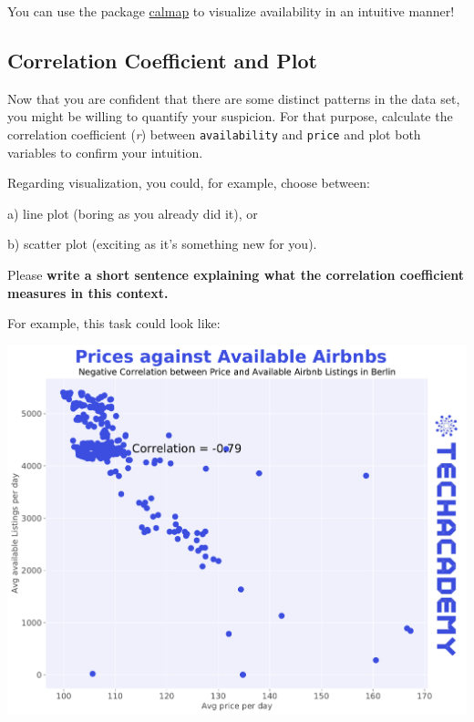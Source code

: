 \documentclass[
  11pt,
]{article}
\newenvironment{tipsp}[1]
  {
  \begin{itemize}
  \footnotesize
  \renewcommand{\labelitemi}{
    \raisebox{-.7\height}[0pt][0pt]{
      {\setkeys{Gin}{width=3em,keepaspectratio}
        \texttt{[image: images/\#1.png]}}
    }
  }
  \setlength{\fboxsep}{1em}
  \begin{pbox}
  \item
  }
  {
  \end{pbox}
  \end{itemize}
  }
\begin{document}
\begin{tipsp}p
You can use the package \href{https://pythonhosted.org/calmap/}{calmap} to visualize availability in an intuitive manner!

\end{tipsp}

\hypertarget{correlation-coefficient-and-plot}{%
\subsection{Correlation Coefficient and Plot}\label{correlation-coefficient-and-plot}}

Now that you are confident that there are some distinct patterns in the data set, you might be willing to quantify your suspicion.
For that purpose, calculate the correlation coefficient (\emph{r}) between \texttt{availability} and \texttt{price} and plot both variables to confirm your intuition.

Regarding visualization, you could, for example, choose between:

a) line plot (boring as you already did it), or

b) scatter plot (exciting as it's something new for you).

Please \textbf{write a short sentence explaining what the correlation coefficient measures in this context.}

For example, this task could look like:

\begin{center}\includegraphics[width=1\linewidth]{plot/01_python/corr_availability_price} \end{center}
\end{document}
